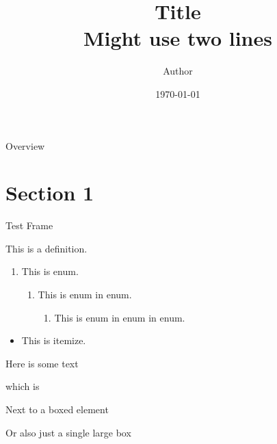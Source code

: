 \documentclass{beamer}
\title{Title \\ Might use two lines}
\author{Author}
\institute{Paderborn University}
\date{\today}
\begin{document}
\begin{frame}
  \titlepage
\end{frame}

\begin{frame}{Overview}
\tableofcontents
\end{frame}

\section{Section 1}

\begin{frame}{Test Frame}
	\begin{definition}
		This is a definition.
	\end{definition}
	\begin{enumerate}
		\item This is enum.
		\begin{enumerate}
			\item This is enum in enum.
			\begin{enumerate}
				\item This is enum in enum in enum.
			\end{enumerate}
		\end{enumerate}
	\end{enumerate}
	\begin{itemize}
		\item This is itemize.
	\end{itemize}
	
	\begin{element}[0.49]
		Here is some text

		which is 
	\end{element}
	\hfill
	\begin{boxedelement}[0.49]
		Next to a boxed element
	\end{boxedelement}
	
	\begin{boxedelement}
		Or also just a single large box
	\end{boxedelement}
\end{frame}
\end{document}
